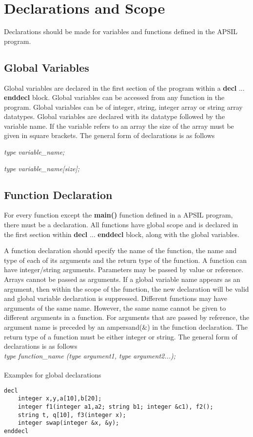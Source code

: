 \documentclass[11pt]{article}
\begin{document}
\section{Declarations and Scope}

Declarations should be made for  variables and functions defined in the APSIL program.
\subsection{Global Variables}
Global variables are declared in the first section of the program within a \textbf{decl} ... \textbf{enddecl} block. Global variables can be accessed from any function in the program. Global variables can be of integer, string, integer array or string array datatypes. Global variables are declared with its datatype followed by the variable name. If the variable refers to an array the size of the array must be given in square brackets. The general form of declarations is as follows 

\textit{type variable\_name;} 

\textit{type variable\_name[size];}

\subsection{Function Declaration}
For every function except the \textbf{main()} function defined in a APSIL program, there must be a declaration. All functions have global scope and is declared in the first section within  \textbf{decl} ... \textbf{enddecl} block, along with the global variables.

A function declaration should specify the name of the function, the name and type of each of its arguments and the return type of the function. A function can have integer/string arguments. Parameters may be passed by value or reference. Arrays cannot be passed as arguments. If a global variable name appears as an argument, then within the scope of the function, the new declaration will be valid and global variable declaration is suppressed. Different functions may have arguments of the same name. However, the same name cannot be given to different arguments in a function. For arguments that are passed by reference, the argument name is preceded by an ampersand(\&) in the function declaration. The return type of a function must be either integer or string. The general form of declarations is as follows \\ 

\textit{type function\_name (type argument1, type argument2...);}
\\
\\
Examples for global declarations
\begin{lstlisting}
decl
	integer x,y,a[10],b[20];	
	integer f1(integer a1,a2; string b1; integer &c1), f2(); 
	string t, q[10], f3(integer x); 
	integer swap(integer &x, &y);	 
enddecl
\end{lstlisting}
\end{document}
